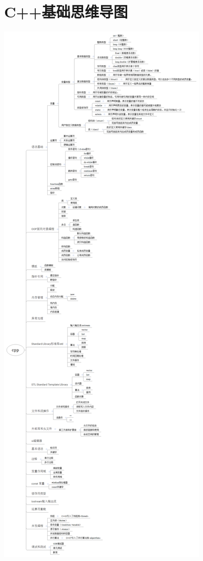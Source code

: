 \documentclass[12pt,twiside,a4paper]{ctexbook}
\numberwithin{chapter}{part}
\begin{document}
\chapter{C++基础思维导图}
\includegraphics[scale=0.15]{cpp.png}
\end{document}
